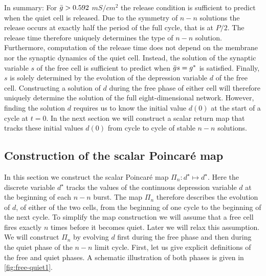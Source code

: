 \documentclass[../manuscript.tex]{subfiles}
\begin{document}
In summary: For $\bar g>0.592$ $\si{mS/cm^{2}}$ the release condition is sufficient to predict when the quiet cell is released.
Due to the symmetry of $n-n$ solutions the release occurs at exactly half the period of the full cycle, that is at $P/2$.
The release time therefore uniquely determines the type of $n-n$ solution.
Furthermore, computation of the release time does not depend on the membrane nor the synaptic dynamics of the quiet cell.
Instead, the solution of the synaptic variable $s$ of the free cell is sufficient to predict when $\bar g s=g^{*}$ is satisfied.
Finally, $s$ is solely determined by the evolution of the depression variable $d$ of the free cell.
Constructing a solution of $d$ during the free phase of either cell will therefore uniquely determine the solution of the full eight-dimensional network.
However, finding the solution $d$ requires us to know the initial value $d(0)$ at the start of a cycle at $t=0$.
In the next section we will construct a scalar return map that tracks these initial values $d(0)$ from cycle to cycle of stable $n-n$ solutions.

\subsection{Construction of the scalar Poincaré map}
In this section we construct the scalar Poincaré map $\Pi_{n}:d^{\star}\mapsto d^{\star}$.
Here the discrete variable $d^{\star}$ tracks the values of the continuous depression variable $d$ at the beginning of each $n-n$ burst.
The map $\Pi_{n}$ therefore describes the evolution of $d$, of either of the two cells, from the beginning of one cycle to the beginning of the next cycle.
To simplify the map construction we will assume that a free cell fires exactly $n$ times before it becomes quiet.
Later we will relax this assumption.
We will construct $\Pi_{n}$ by evolving $d$ first during the free phase and then during the quiet phase of the $n-n$ limit cycle.
First, let us give explicit definitions of the free and quiet phases.
A schematic illustration of both phases is given in \cref{fig:free-quiet1}.
\end{document}
